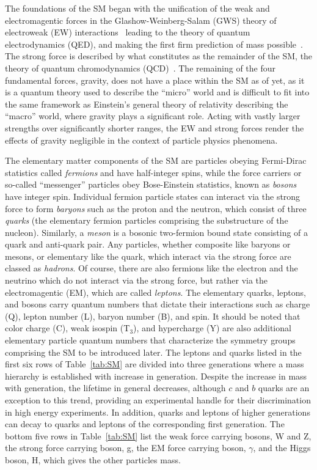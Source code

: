 The foundations of the SM began with the unification of the weak and electromagentic forces in the Glashow-Weinberg-Salam (GWS) theory of electroweak (EW) interactions~\cite{Glashow:1959wxa, Salam:1968rm, PhysRevLett.19.1264} leading to the theory of quantum electrodynamics (QED), and making the first firm prediction of mass possible~\cite{Griffiths:111880}. The strong force is described by what constitutes as the remainder of the SM, the theory of quantum chromodynamics (QCD)~\cite{PhysRevLett.30.1346,PhysRevLett.30.1343}. The remaining of the four fundamental forces, gravity, does not have a place within the SM as of yet, as it is a quantum theory used to describe the ``micro'' world and is difficult to fit into the same framework as Einstein's general theory of relativity describing the ``macro'' world, where gravity plays a significant role. Acting with vastly larger strengths over significantly shorter ranges, the EW and strong forces render the effects of gravity negligible in the context of particle physics phenomena. 

The elementary matter components of the SM are particles obeying Fermi-Dirac statistics called \textit{fermions} and have half-integer spins, while the force carriers or so-called ``messenger'' particles obey Bose-Einstein statistics, known as \textit{bosons} have integer spin. Individual fermion particle states can interact via the strong force to form \textit{baryons} such as the proton and the neutron, which consist of three \textit{quarks} (the elementary fermion particles comprising the substructure of the nucleon). Similarly, a \textit{meson} is a bosonic two-fermion bound state consisting of a quark and anti-quark pair. Any particles, whether composite like baryons or mesons, or elementary like the quark, which interact via the strong force are classed as \textit{hadrons}. Of course, there are also fermions like the electron and the neutrino which do not interact via the strong force, but rather via the electromagentic (EM), which are called \textit{leptons}. The elementary quarks, leptons, and bosons carry quantum numbers that dictate their interactions such as charge (Q), lepton number (L), baryon number (B), and spin. It should be noted that color charge (C), weak isospin (T$_{3}$), and hypercharge (Y) are also additional elementary particle quantum numbers that characterize the symmetry groups comprising the SM to be introduced later. The leptons and quarks listed in the first six rows of Table~\ref{tab:SM} are divided into three generations where a mass hierarchy is established with increase in generation. Despite the increase in mass with generation, the lifetime in general decreases, although $c$ and $b$ quarks are an exception to this trend, providing an experimental handle for their discrimination in high energy experiments. In addition, quarks and leptons of higher generations can decay to quarks and leptons of the corresponding first generation. The bottom five rows in Table~\ref{tab:SM} list the weak force carrying bosons, W and Z, the strong force carrying boson, g, the EM force carrying boson, $\gamma$, and the Higgs boson, H, which gives the other particles mass.  

